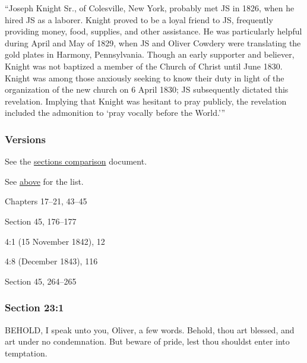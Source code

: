 				``Joseph Knight Sr., of Colesville, New York, probably met JS in 1826, when he hired JS as a laborer. Knight proved to be a loyal friend to JS, frequently providing money, food, supplies, and other assistance. He was particularly helpful during April and May of 1829, when JS and Oliver Cowdery were translating the gold plates in Harmony, Pennsylvania. Though an early supporter and believer, Knight was not baptized a member of the Church of Christ until June 1830. Knight was among those anxiously seeking to know their duty in light of the organization of the new church on 6 April 1830; JS subsequently dictated this revelation. Implying that Knight was hesitant to pray publicly, the revelation included the admonition to `pray vocally before the World.'''
			
	\subsubsection{Versions}
		\label{DC23-V}
		
		See the \href{https://drive.google.com/file/d/1goAvNz8jS4R8slYfMG_db55Ty2z_vmgK/view?usp=sharing}{sections comparison} document.
	
		\begin{compactdesc}
			\item[JSP] See \hyperref[DC23-JSP]{above} for the list.
			\item[BC] Chapters 17--21, 43--45
			\item[DC 1835] Section 45, 176--177
			\item[TS] 4:1 (15 November 1842), 12
			\item[MS] 4:8 (December 1843), 116
			\item[DC 1844] Section 45, 264--265
		\end{compactdesc}

	\subsubsection{Section 23:1} %
		\label{DC23-1}

		BEHOLD, I speak unto you, Oliver, a few words. Behold, thou art blessed, and art under no condemnation. But beware of pride, lest thou shouldst enter into temptation.


